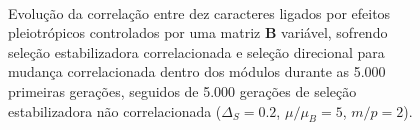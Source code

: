\begin{figure}[htbp]
    \vspace{-18pt}
    \vspace{11pt}
    \\
    \caption{Evolução da correlação entre dez caracteres ligados por efeitos
        pleiotrópicos controlados por uma matriz $\mathbf{B}$ variável, sofrendo
        seleção estabilizadora correlacionada e seleção direcional para
        mudança correlacionada dentro dos módulos durante as 5.000
        primeiras gerações, seguidos de 5.000 gerações de seleção
        estabilizadora não correlacionada ($\Delta_S = 0.2$, $\mu/\mu_B=5$,
    $m/p=2$).}
    \label{posselecaoSemEstab}
\end{figure}

